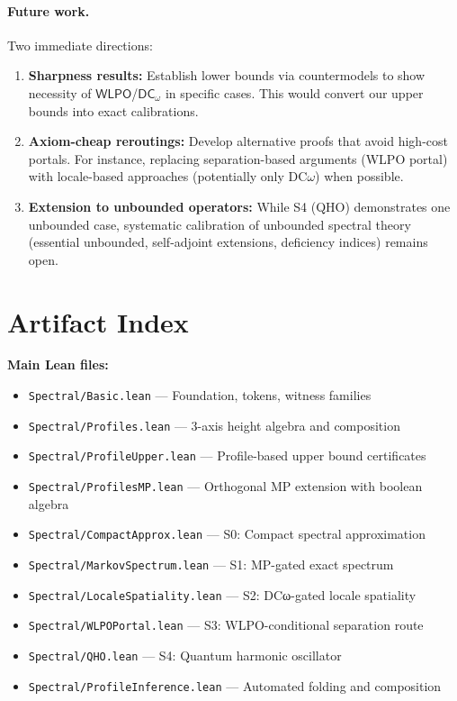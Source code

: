 \documentclass[11pt]{article}
\newcommand{\WLPO}{\mathsf{WLPO}}
\newcommand{\DCw}{\mathsf{DC}_{\omega}}
\newcommand{\lean}[1]{\texttt{#1}}
\theoremstyle{plain}
\theoremstyle{definition}
\theoremstyle{remark}
\begin{document}
\paragraph{Future work.}
Two immediate directions: 
\begin{enumerate}
\item \textbf{Sharpness results:} Establish lower bounds via countermodels to show necessity of $\WLPO$/$\DCw$ in specific cases. This would convert our upper bounds into exact calibrations.

\item \textbf{Axiom-cheap reroutings:} Develop alternative proofs that avoid high-cost portals. For instance, replacing separation-based arguments (WLPO portal) with locale-based approaches (potentially only DC$\omega$) when possible.

\item \textbf{Extension to unbounded operators:} While S4 (QHO) demonstrates one unbounded case, systematic calibration of unbounded spectral theory (essential unbounded, self-adjoint extensions, deficiency indices) remains open.
\end{enumerate}

\appendix
\section{Artifact Index}

\textbf{Main Lean files:}
\begin{itemize}
\item \lean{Spectral/Basic.lean} — Foundation, tokens, witness families
\item \lean{Spectral/Profiles.lean} — 3-axis height algebra and composition  
\item \lean{Spectral/ProfileUpper.lean} — Profile-based upper bound certificates
\item \lean{Spectral/ProfilesMP.lean} — Orthogonal MP extension with boolean algebra
\item \lean{Spectral/CompactApprox.lean} — S0: Compact spectral approximation
\item \lean{Spectral/MarkovSpectrum.lean} — S1: MP-gated exact spectrum
\item \lean{Spectral/LocaleSpatiality.lean} — S2: DCω-gated locale spatiality  
\item \lean{Spectral/WLPOPortal.lean} — S3: WLPO-conditional separation route
\item \lean{Spectral/QHO.lean} — S4: Quantum harmonic oscillator
\item \lean{Spectral/ProfileInference.lean} — Automated folding and composition
\end{itemize}
\end{document}
